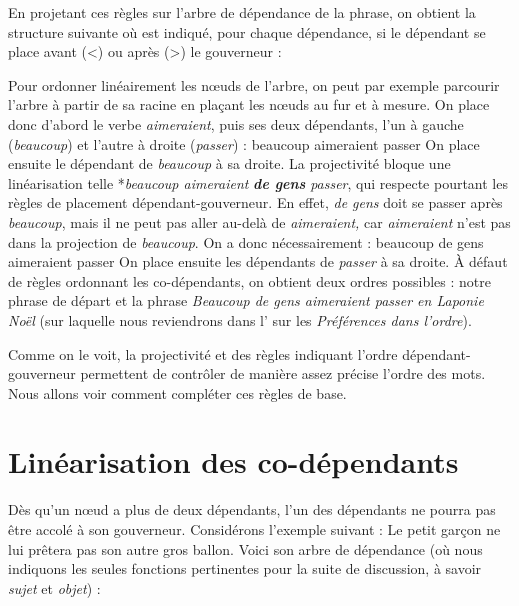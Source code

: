 En projetant ces règles sur l’arbre de dépendance de la phrase, on obtient la structure suivante où est indiqué, pour chaque dépendance, si le dépendant se place avant (<) ou après (>) le gouverneur :

\begin{figure}

\caption{\label{fig:Arbre de dépendance avec spécifications d’ordre}}

\end{figure}

Pour ordonner linéairement les nœuds de l’arbre, on peut par exemple parcourir l’arbre à partir de sa racine en plaçant les nœuds au fur et à mesure. On place donc d’abord le verbe \textit{aimeraient}, puis ses deux dépendants, l’un à gauche (\textit{beaucoup}) et l’autre à droite (\textit{passer}) :
\ea
    {beaucoup aimeraient passer}
\z
On place ensuite le dépendant de \textit{beaucoup} à sa droite. La projectivité bloque une linéarisation telle *\textit{beaucoup aimeraient} \textbf{\textit{de gens}} \textit{passer}, qui respecte pourtant les règles de placement dépendant-gouverneur. En effet, \textit{de gens} doit se passer après \textit{beaucoup}, mais il ne peut pas aller au-delà de \textit{aimeraient,} car \textit{aimeraient} n’est pas dans la projection de \textit{beaucoup}. On a donc nécessairement :
\ea
    {beaucoup de gens aimeraient passer}
\z
On place ensuite les dépendants de \textit{passer} à sa droite. À défaut de règles ordonnant les co-dépendants, on obtient deux ordres possibles : notre phrase de départ et la phrase \textit{Beaucoup de gens aimeraient passer en Laponie Noël} (sur laquelle nous reviendrons dans l’ sur les \textit{Préférences dans l’ordre}).

Comme on le voit, la projectivité et des règles indiquant l’ordre dépendant-gouverneur permettent de contrôler de manière assez précise l’ordre des mots. Nous allons voir comment compléter ces règles de base.

\section{Linéarisation des co-dépendants}\label{sec:3.5.19}

Dès qu’un nœud a plus de deux dépendants, l’un des dépendants ne pourra pas être accolé à son gouverneur. Considérons l’exemple suivant :
\ea
{Le petit garçon ne lui prêtera pas son autre gros ballon}.
\z
Voici son arbre de dépendance (où nous indiquons les seules fonctions pertinentes pour la suite de discussion, à savoir \textit{sujet} et \textit{objet}) :

